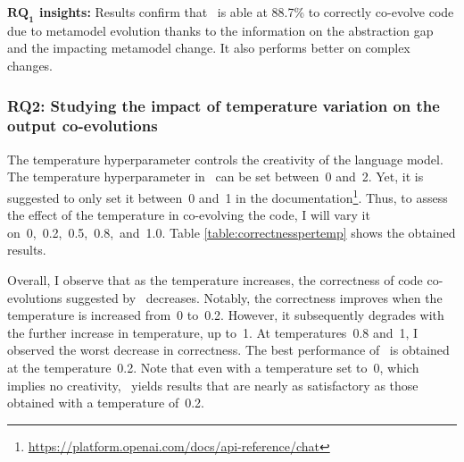 \begin{tcolorbox}[boxsep=-2pt]
	\textbf{$\boldsymbol{RQ_1}$ insights:}
	Results confirm that \LLM~is able at 88.7\% to correctly co-evolve code due to metamodel evolution thanks to the information on the abstraction gap and the impacting metamodel change. It also performs better on complex changes.  
\end{tcolorbox}


\subsubsection{RQ2: Studying the impact of temperature variation on the output co-evolutions}

The temperature hyperparameter controls the creativity of the language model. The temperature hyperparameter in \LLM~can be set between~0 and~2. Yet, it is suggested to only set it between~0 and~1 in the documentation\footnote{\url{https://platform.openai.com/docs/api-reference/chat}}. Thus, to assess the effect of the temperature in co-evolving the code, I will vary it on~0,~0.2,~0.5,~0.8,~and~1.0. 
Table \ref{table:correctnesspertemp} shows the obtained results. 


Overall, I observe that as the temperature increases, the correctness of code co-evolutions suggested by \LLM~decreases. Notably, the correctness improves when the temperature is increased from~0 to~0.2. However, it subsequently degrades with the further increase in temperature, up to~1. At temperatures~0.8 and~1, I observed the worst decrease in correctness. %
The best performance of \LLM~is obtained at the temperature~0.2. Note that even with a temperature set to~0, which implies no creativity, \LLM~yields results that are nearly as satisfactory as those obtained with a temperature of~0.2.

